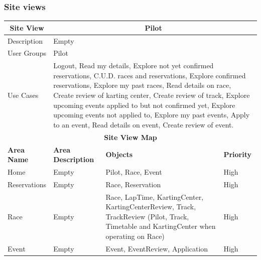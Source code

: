 \documentclass{beamer}
\begin{document}
\begin{frame}
    \frametitle{Site views}
    \begin{table}
        \centering
        \tiny
        \setlength{\tabcolsep}{1pt}
        \begin{tabular}{|m{2cm}|m{4cm}|m{3cm}|m{1cm}|}
        \hline
        \multicolumn{1}{|c|}{\textbf{Site View}} & \multicolumn{3}{c|}{\textbf{Pilot}} \\
        \hline
        Description & \multicolumn{3}{m{8cm}|}{Empty} \\
        \hline
        User Groups & \multicolumn{3}{m{8cm}|}{Pilot} \\
        \hline
        Use Cases & \multicolumn{3}{m{8cm}|}{Logout,
        Read my details, Explore not yet confirmed reservations, 
        C.U.D. races and reservations, Explore confirmed reservations, 
        Explore my past races, Read details on race, Create review of karting center, 
        Create review of track, Explore upcoming events applied to but not confirmed yet, 
        Explore upcoming events not applied to, Explore my past events, Apply to an event, 
        Read details on event, Create review of event.} \\
        \hline
        \multicolumn{4}{|c|}{\textbf{Site View Map}} \\
        \hline
        \textbf{Area Name} & \textbf{Area Description} & \textbf{Objects} & \textbf{Priority} \\
        \hline
        Home & Empty & Pilot, Race, Event & High \\
        \hline
        Reservations & Empty & Race, Reservation & High \\
        \hline
        Race & Empty & Race, LapTime, KartingCenter, KartingCenterReview, Track, TrackReview
        (Pilot, Track, Timetable and KartingCenter when operating on Race) & High \\
        \hline
        Event & Empty & Event, EventReview, Application & High \\
        \hline
        \end{tabular}
    \end{table}
\end{frame}
\end{document}
